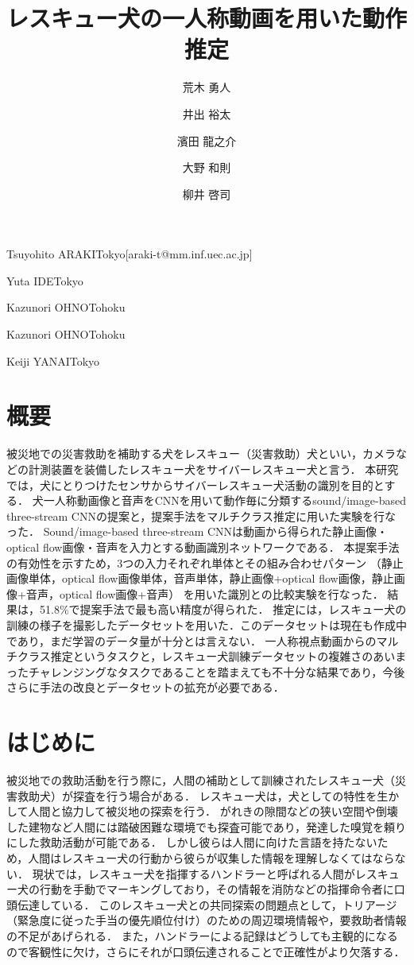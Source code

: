 \documentclass[MIRU,submit]{miru2019j}
\begin{document}
\title{レスキュー犬の一人称動画を用いた動作推定}


 \author{荒木 勇人}{Tsuyohito ARAKI}{Tokyo}[araki-t@mm.inf.uec.ac.jp]
 \author{井出 裕太}{Yuta IDE}{Tokyo}%
 \author{濱田 龍之介}{Kazunori OHNO}{Tohoku}%
 \author{大野 和則}{Kazunori OHNO}{Tohoku}%
 \author{柳井 啓司}{Keiji YANAI}{Tokyo}%


\maketitle
\section*{概要}
被災地での災害救助を補助する犬をレスキュー（災害救助）犬といい，カメラなどの計測装置を装備したレスキュー犬をサイバーレスキュー犬と言う．
本研究では，犬にとりつけたセンサからサイバーレスキュー犬活動の識別を目的とする．
犬一人称動画像と音声をCNNを用いて動作毎に分類するsound/image-based three-stream CNNの提案と，提案手法をマルチクラス推定に用いた実験を行なった．
Sound/image-based three-stream CNNは動画から得られた静止画像・optical flow画像・音声を入力とする動画識別ネットワークである．
本提案手法の有効性を示すため，3つの入力それぞれ単体とその組み合わせパターン
（静止画像単体，optical flow画像単体，音声単体，静止画像+optical flow画像，静止画像+音声，optical flow画像+音声）
を用いた識別との比較実験を行なった．
結果は，51.8\%で提案手法で最も高い精度が得られた．
推定には，レスキュー犬の訓練の様子を撮影したデータセットを用いた．このデータセットは現在も作成中であり，まだ学習のデータ量が十分とは言えない．
一人称視点動画からのマルチクラス推定というタスクと，レスキュー犬訓練データセットの複雑さのあいまったチャレンジングなタスクであることを踏まえても不十分な結果であり，今後さらに手法の改良とデータセットの拡充が必要である．

\section{はじめに}
被災地での救助活動を行う際に，人間の補助として訓練されたレスキュー犬（災害救助犬）が探査を行う場合がある．
レスキュー犬は，犬としての特性を生かして人間と協力して被災地の探索を行う．
がれきの隙間などの狭い空間や倒壊した建物など人間には踏破困難な環境でも探査可能であり，発達した嗅覚を頼りにした救助活動が可能である．
しかし彼らは人間に向けた言語を持たないため，人間はレスキュー犬の行動から彼らが収集した情報を理解しなくてはならない．
現状では，レスキュー犬を指揮するハンドラーと呼ばれる人間がレスキュー犬の行動を手動でマーキングしており，その情報を消防などの指揮命令者に口頭伝達している．
このレスキュー犬との共同探索の問題点として，トリアージ（緊急度に従った手当の優先順位付け）のための周辺環境情報や，要救助者情報の不足があげられる．
また，ハンドラーによる記録はどうしても主観的になるので客観性に欠け，さらにそれが口頭伝達されることで正確性がより欠落する．
\end{document}
